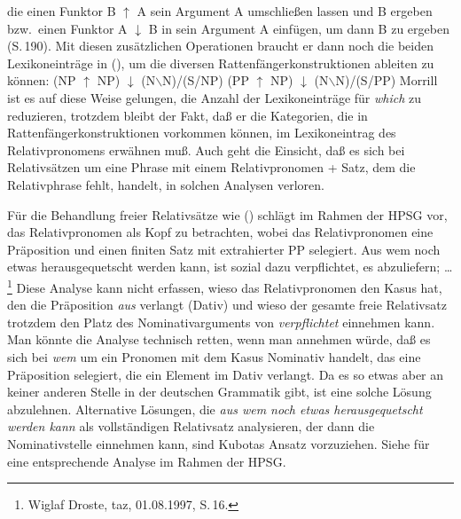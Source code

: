 die einen Funktor B $\uparrow$ A sein Argument A umschließen lassen und B ergeben bzw.\ einen Funktor A $\downarrow$
B in sein Argument A einfügen, um dann B zu ergeben (S.\,190). Mit diesen zusätzlichen Operationen
braucht er dann noch die beiden Lexikoneinträge in (), um die diversen
Rattenfängerkonstruktionen ableiten zu können:
\eal
\ex (NP $\uparrow$ NP) $\downarrow$ (N$\backslash$N)/(S/NP)
\ex (PP $\uparrow$ NP) $\downarrow$ (N$\backslash$N)/(S/PP)
\zl
Morrill ist es auf diese Weise gelungen, die Anzahl der Lexikoneinträge für \emph{which} zu
reduzieren, trotzdem bleibt der Fakt, daß er die Kategorien, die in Rattenfängerkonstruktionen
vorkommen können, im Lexikoneintrag des Relativpronomens erwähnen muß. 
Auch geht die Einsicht, daß es sich bei Relativsätzen um eine Phrase mit einem Relativpronomen
+ Satz, dem die Relativphrase fehlt, handelt, in solchen Analysen verloren.

Für die Behandlung freier Relativsätze wie () schlägt \citet[]{Kubota2002a} im
Rahmen der HPSG vor, das Relativpronomen als Kopf zu betrachten, wobei das Relativpronomen eine Präposition und einen finiten
Satz mit extrahierter PP selegiert.
\ea
Aus wem noch etwas herausgequetscht werden kann, ist sozial dazu verpflichtet, es abzuliefern; \ldots\footnote{
        Wiglaf Droste, taz, 01.08.1997, S.\,16.
      }
\z
Diese Analyse kann nicht erfassen, wieso das Relativpronomen den Kasus hat, den die Präposition
\emph{aus} verlangt (Dativ) und wieso der gesamte freie Relativsatz trotzdem den Platz des
Nominativarguments von \emph{verpflichtet} einnehmen kann. Man könnte die Analyse technisch retten,
wenn man annehmen würde, daß es sich bei \emph{wem} um ein Pronomen mit dem Kasus Nominativ handelt,
das eine Präposition selegiert, die ein Element im Dativ verlangt. Da es so etwas aber an keiner
anderen Stelle in der deutschen Grammatik gibt, ist eine solche Lösung abzulehnen. Alternative
Lösungen, die \emph{aus wem noch etwas herausgequetscht werden kann} als vollständigen Relativsatz
analysieren, der dann die Nominativstelle einnehmen kann, sind Kubotas Ansatz vorzuziehen. Siehe
 für eine entsprechende Analyse im Rahmen der HPSG.%


